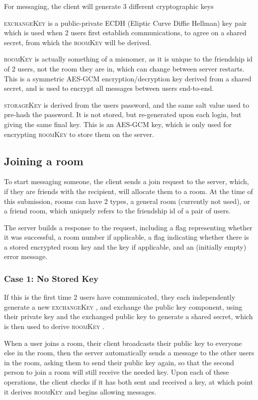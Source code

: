 \documentclass[12pt]{article}
\newcommand{\ekey}{\textsc{exchangeKey} }
\newcommand{\rkey}{\textsc{roomKey} }
\newcommand{\skey}{\textsc{storageKey} }
\begin{document}
For messaging, the client will generate 3 different cryptographic keys

\ekey is a public-private ECDH (Eliptic Curve Diffie Hellman) key pair which is used when 2 users first establish communications, to agree on a shared secret, from which the \textsc{roomKey} will be derived.

\rkey is actually something of a misnomer, as it is unique to the friendship id of 2 users, not the room they are in, which can change between server restarts. This is a symmetric AES-GCM encryption/decryption key derived from a shared secret, and is used to encrypt all messages between users end-to-end.

\skey is derived from the users password, and the same salt value used to pre-hash the password. It is not stored, but re-generated upon each login, but giving the same final key. This is an AES-GCM key, which is only used for encrypting \rkey to store them on the server.

\subsection{Joining a room}

To start messaging someone, the client sends a join request to the server, which, if they are friends with the recipient, will allocate them to a room. At the time of this submission, rooms can have 2 types, a general room (currently not used), or a friend room, which uniquely refers to the friendship id of a pair of users.

The server builds a response to the request, including a flag representing whether it was successful, a room number if applicable, a flag indicating whether there is a stored encrypted room key and the key if applicable, and an (initially empty) error message.

\subsubsection{Case 1: No Stored Key}

If this is the first time 2 users have communicated, they each independently generate a new \ekey, and exchange the public key component, using their private key and the exchanged public key to generate a shared secret, which is then used to derive \rkey.

When a user joins a room, their client broadcasts their public key to everyone else in the room, then the server automatically sends a message to the other users in the room, asking them to send their public key again, so that the second person to join a room will still receive the needed key. Upon each of these operations, the client checks if it has both sent and received a key, at which point it derives \rkey and begins allowing messages.
\end{document}
